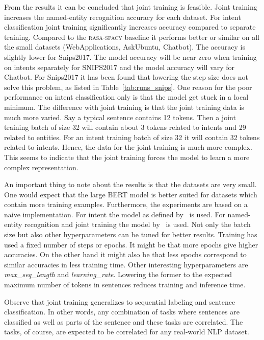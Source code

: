 From the results it can be concluded that joint training is feasible.
Joint training increases the named-entity recognition accuracy for each dataset.
For intent classification joint training significantly increases accuracy compared to separate training.
Compared to the \textsc{rasa-spacy} baseline it performs better or similar on all the small datasets (WebApplications, AskUbuntu, Chatbot).
The accuracy is slightly lower for Snips2017.
The model accuracy will be near zero when training on intents separately for SNIPS2017 and the model accuracy will vary for Chatbot.
For Snips2017 it has been found that lowering the step size does not solve this problem, as listed in Table~\ref{tab:runs_snips}.
One reason for the poor performance on intent classification only is that the model get stuck in a local minimum.
The difference with joint training is that the joint training data is much more varied.
Say a typical sentence contains 12 tokens.
Then a joint training batch of size 32 will contain about 3 tokens related to intents and 29 related to entities.
For an intent training batch of size 32 it will contain 32 tokens related to intents.
Hence, the data for the joint training is much more complex.
This seems to indicate that the joint training forces the model to learn a more complex representation.

An important thing to note about the results is that the datasets are very small.
One would expect that the large BERT model is better suited for datasets which contain more training examples.
Furthermore, the experiments are based on a naive implementation.
For intent the model as defined by~\citet{devlin2018github} is used.
For named-entity recognition and joint training the model by~\citet{kyzhouhzau2018ner} is used.
Not only the batch size but also other hyperparameters can be tuned for better results.
Training has used a fixed number of steps or epochs.
It might be that more epochs give higher accuracies.
On the other hand it might also be that less epochs correspond to similar accuracies in less training time.
Other interesting hyperparameters are \textit{max\_seq\_length} and \textit{learning\_rate}.
Lowering the former to the expected maximum number of tokens in sentences reduces training and inference time.

Observe that joint training generalizes to sequential labeling and sentence classification.
In other words, any combination of tasks where sentences are classified as well as parts of the sentence and these tasks are correlated.
The tasks, of course, are expected to be correlated for any real-world NLP dataset.

